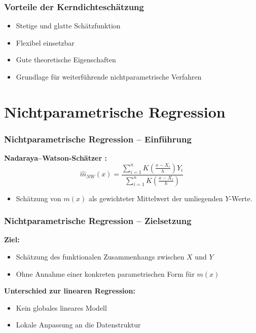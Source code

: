 \documentclass{beamer}
\begin{document}
	
	\begin{frame}
		\frametitle{Vorteile der Kerndichteschätzung}
		
		\begin{itemize}
			\item Stetige und glatte Schätzfunktion
			\item Flexibel einsetzbar
			\item Gute theoretische Eigenschaften
		\end{itemize}
		
		\vspace{0.5em}
		
		\begin{itemize}
			\item Grundlage für weiterführende nichtparametrische Verfahren
		\end{itemize}
	\end{frame}
	
	
	\section{Nichtparametrische Regression}
	
	
	\begin{frame}
		\frametitle{Nichtparametrische Regression -- Einführung}
		
		\textbf{Nadaraya--Watson-Schätzer \cite{NadarayaWatson1964, Watson1964}:}
		\begin{equation}
			\hat{m}_{NW}(x) =
			\frac{\sum_{i=1}^n K\left(\frac{x - X_i}{h}\right) Y_i}
			{\sum_{i=1}^n K\left(\frac{x - X_i}{h}\right)}
		\end{equation}
		
		\begin{itemize}
			\item Schätzung von $m(x)$ als gewichteter Mittelwert der umliegenden $Y$-Werte.
		\end{itemize}
	\end{frame}
	
	
	\begin{frame}
		\frametitle{Nichtparametrische Regression -- Zielsetzung}
		
		\textbf{Ziel:}
		\begin{itemize}
			\item Schätzung des funktionalen Zusammenhangs zwischen $X$ und $Y$
			\item Ohne Annahme einer konkreten parametrischen Form für $m(x)$
		\end{itemize}
		
		\vspace{0.5em}
		
		\textbf{Unterschied zur linearen Regression:}
		\begin{itemize}
			\item Kein globales lineares Modell
			\item Lokale Anpassung an die Datenstruktur
		\end{itemize}
	\end{frame}
	
\end{document}
